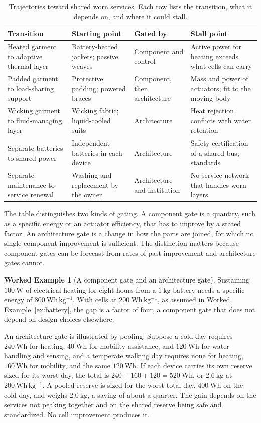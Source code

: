 \documentclass[11pt,openany]{book}
\theoremstyle{definition}
\newtheorem{example}{Worked Example}[chapter]
\theoremstyle{remark}
\begin{document}
\begin{table}[ht]
\centering
\caption{Trajectories toward shared worn services. Each row lists the transition, what it depends on, and where it could stall.}
\label{tab:traj}
\small
\begin{tabular}{@{}p{3.0cm}p{3.6cm}p{2.5cm}p{3.5cm}@{}}
\toprule
Transition & Starting point & Gated by & Stall point \\
\midrule
Heated garment to adaptive thermal layer & Battery-heated jackets; passive weaves & Component and control & Active power for heating exceeds what cells can carry \\
Padded garment to load-sharing support & Protective padding; powered braces & Component, then architecture & Mass and power of actuators; fit to the moving body \\
Wicking garment to fluid-managing layer & Wicking fabric; liquid-cooled suits & Architecture & Heat rejection conflicts with water retention \\
Separate batteries to shared power & Independent batteries in each device & Architecture & Safety certification of a shared bus; standards \\
Separate maintenance to service renewal & Washing and replacement by the owner & Architecture and institution & No service network that handles worn layers \\
\bottomrule
\end{tabular}
\end{table}

The table distinguishes two kinds of gating. A component gate is a quantity, such as a specific energy or an actuator efficiency, that has to improve by a stated factor. An architecture gate is a change in how the parts are joined, for which no single component improvement is sufficient. The distinction matters because component gates can be forecast from rates of past improvement and architecture gates cannot.

\begin{example}[A component gate and an architecture gate]
\label{ex:gates}
Sustaining $100\ \mathrm{W}$ of electrical heating for eight hours from a $1\ \mathrm{kg}$ battery needs a specific energy of $800\ \mathrm{Wh\,kg^{-1}}$. With cells at $200\ \mathrm{Wh\,kg^{-1}}$, as assumed in Worked Example~\ref{ex:battery}, the gap is a factor of four, a component gate that does not depend on design choices elsewhere.

An architecture gate is illustrated by pooling. Suppose a cold day requires $240\ \mathrm{Wh}$ for heating, $40\ \mathrm{Wh}$ for mobility assistance, and $120\ \mathrm{Wh}$ for water handling and sensing, and a temperate walking day requires none for heating, $160\ \mathrm{Wh}$ for mobility, and the same $120\ \mathrm{Wh}$. If each device carries its own reserve sized for its worst day, the total is $240+160+120=520\ \mathrm{Wh}$, or $2.6\ \mathrm{kg}$ at $200\ \mathrm{Wh\,kg^{-1}}$. A pooled reserve is sized for the worst total day, $400\ \mathrm{Wh}$ on the cold day, and weighs $2.0\ \mathrm{kg}$, a saving of about a quarter. The gain depends on the services not peaking together and on the shared reserve being safe and standardized. No cell improvement produces it.
\end{example}
\end{document}
